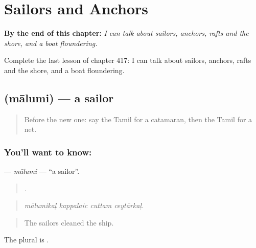 
\chapter{Sailors and Anchors}
\label{ch:ta-sailors-and-anchors}

\begin{chapteropening}
\textbf{By the end of this chapter:} \emph{I can talk about sailors, anchors, rafts and the shore, and a boat floundering.}

Complete the last lesson of chapter 417: I can talk about sailors, anchors, rafts and the shore, and a boat floundering.
\end{chapteropening}

\section[\texorpdfstring{\ta{மாலுமி} (mālumi)}{மாலுமி (mālumi)}]{ (mālumi) — a sailor}

\label{lesson:TA-C417-malumi}



\begin{quote}
Before the new one: say the Tamil for a catamaran, then the Tamil for a net.
\end{quote}

\subsection*{You'll want to know: }
\textbf{} — \emph{mālumi} — \textquotedblleft{}a sailor\textquotedblright{}.

\begin{quote}
   .
\end{quote}

\begin{quote}
\emph{mālumikaḷ kappalaic cuttam ceytārkaḷ.}
\end{quote}

\begin{quote}
The sailors cleaned the ship.
\end{quote}

The plural is .


